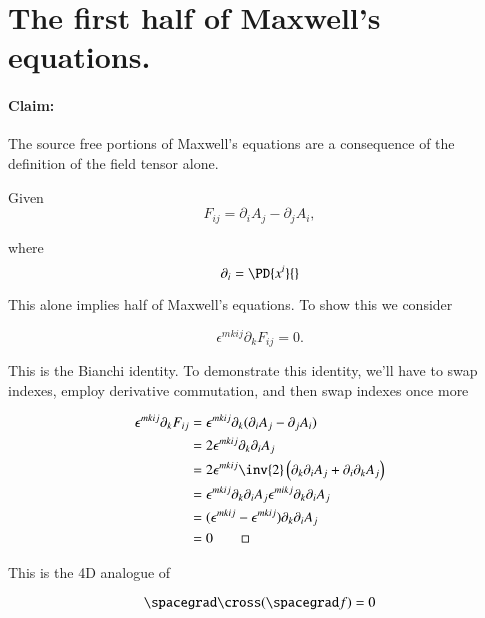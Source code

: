 \section{The first half of Maxwell's equations.}

\paragraph{Claim: } The source free portions of Maxwell's equations are a consequence of the definition of the field tensor alone.

Given
\begin{equation}\label{eqn:relativisticElectrodynamicsL11:670}
F_{i j} = \partial_i A_j - \partial_j A_i,
\end{equation}

where
\begin{equation}\label{eqn:relativisticElectrodynamicsL11:690}
\partial_i = \PD{x^i}{}
\end{equation}

This alone implies half of Maxwell's equations.  To show this we consider

\begin{equation}\label{eqn:relativisticElectrodynamicsL11:710}
\epsilon^{m k i j} \partial_k F_{i j} = 0.
\end{equation}

This is the Bianchi identity.  To demonstrate this identity, we'll have to swap indexes, employ derivative commutation, and then swap indexes once more

\begin{align*}
\epsilon^{m k i j} \partial_k F_{i j} 
&= \epsilon^{m k i j} \partial_k (\partial_i A_j - \partial_j A_i) \\
&= 2 \epsilon^{m k i j} \partial_k \partial_i A_j \\
&= 2 \epsilon^{m k i j} \inv{2} \left( \partial_k \partial_i A_j + \partial_i \partial_k A_j \right) \\
&= 
\epsilon^{m k i j} \partial_k \partial_i A_j 
\epsilon^{m i k j} \partial_k \partial_i A_j  \\
&= 
(\epsilon^{m k i j} - \epsilon^{m k i j}) \partial_k \partial_i A_j \\
&= 0 \qquad \square
\end{align*}

This is the 4D analogue of 

\begin{equation}\label{eqn:relativisticElectrodynamicsL11:790}
\spacegrad \cross (\spacegrad f) = 0
\end{equation}

